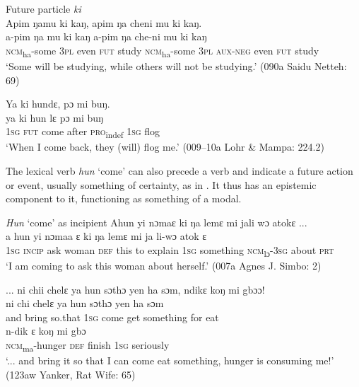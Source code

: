 \ea%
    \label{ex:127}
    Future particle \textit{ki}\\
\ea  Apim ŋamu ki kaŋ, apim ŋa cheni mu ki kaŋ.\\
    \gll a-pim        ŋa    mu  ki    kaŋ    a-pim        ŋa    che-ni    mu  ki    kaŋ\\
    \textsc{ncm}\textsubscript{ha}{}-some  \textsc{3pl}  even  \textsc{fut}   study    \textsc{ncm}\textsubscript{ha}{}-some  \textsc{3pl}  \textsc{aux}{}-\textsc{neg}  even  \textsc{fut}  study\\
    \glt ‘Some will be studying, while others will not be studying.' (090a Saidu Netteh: 69)

\ex  Ya ki hundɛ, pɔ mi buŋ.\\
    \gll ya    ki    hun    lɛ    pɔ      mi    buŋ\\
    \textsc{1sg}  \textsc{fut}  come    after  \textsc{pro}\textsubscript{indef}  \textsc{1sg}  flog\\
    \glt ‘When I come back, they (will) flog me.' (009--10a Lohr \& Mampa: 224.2)
\z
\z

The lexical verb \textit{hun} ‘come' can also precede a verb and indicate a future action or event, usually something of certainty, as in . It thus has an epistemic component to it, functioning as something of a modal.

\ea%
    \label{ex:128}
    \textit{Hun} ‘come' as incipient
    \ea Ahun yi nɔmaɛ ki ŋa lemɛ mi jali wɔ atokɛ ...\\
    \gll a    hun    yi    nɔmaa  ɛ    ki    ŋa  lemɛ    mi    ja        li-wɔ      atok  ɛ\\
    \textsc{1sg}  \textsc{incip}    ask  woman  \textsc{def}  this  to  explain  \textsc{1sg}  something  \textsc{ncm}\textsubscript{lɔ}{}-\textsc{3sg}  about  \textsc{prt}\\
    \glt ‘I am coming to ask this woman about herself.' (007a Agnes J. Simbo: 2)

\ex ... ni chii chelɛ ya hun sɔthɔ yen ha sɔm, ndikɛ koŋ mi gbɔɔ!\\
    \gll ni    chi    chelɛ    ya    hun    sɔthɔ    yen      ha    sɔm\\
    and  bring    so.that  \textsc{1sg}  come    get    something  for    eat\\
    \gll n-dik          ɛ    koŋ    mi    gbɔ\\
    \textsc{ncm}\textsubscript{ma}{}-hunger    \textsc{def}  finish    \textsc{1sg}  seriously\\
    \glt ‘... and bring it so that I can come eat something, hunger is consuming me!' (123aw Yanker, Rat Wife: 65)
\z
\z

